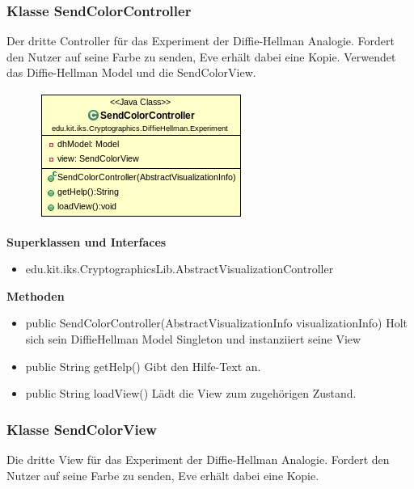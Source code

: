 \documentclass{article}
\begin{document}
\subsubsection{Klasse SendColorController}
      Der dritte Controller für das Experiment der Diffie-Hellman Analogie.
      Fordert den Nutzer auf seine Farbe zu senden, Eve erhält dabei eine Kopie.
      Verwendet das Diffie-Hellman Model und die SendColorView.

      \begin{figure}[H]
        \centering
        \includegraphics{resources/edu-kit-iks-Cryptographics-DiffieHellman-Experiment-SendColorController}
      \end{figure}

      \textbf{Superklassen und Interfaces}
      \begin{itemize}
        \item edu.kit.iks.CryptographicsLib.AbstractVisualizationController
      \end{itemize}

      \textbf{Methoden}
      \begin{itemize}
          \item public SendColorController(AbstractVisualizationInfo visualizationInfo) \newline
              Holt sich sein DiffieHellman Model Singleton und instanziiert seine View
        \item public String getHelp() \newline
        Gibt den Hilfe-Text an.
        \item public String loadView() \newline
        Lädt die View zum zugehörigen Zustand.
      \end{itemize}

\subsubsection{Klasse SendColorView}
      Die dritte View für das Experiment der Diffie-Hellman Analogie.
      Fordert den Nutzer auf seine Farbe zu senden, Eve erhält dabei eine Kopie.
\end{document}
